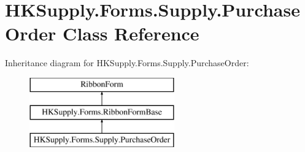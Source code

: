 \hypertarget{class_h_k_supply_1_1_forms_1_1_supply_1_1_purchase_order}{}\section{H\+K\+Supply.\+Forms.\+Supply.\+Purchase\+Order Class Reference}
\label{class_h_k_supply_1_1_forms_1_1_supply_1_1_purchase_order}
Inheritance diagram for H\+K\+Supply.\+Forms.\+Supply.\+Purchase\+Order\+:\begin{figure}[H]
\begin{center}
\leavevmode
\includegraphics[height=3.000000cm]{class_h_k_supply_1_1_forms_1_1_supply_1_1_purchase_order}
\end{center}
\end{figure}
